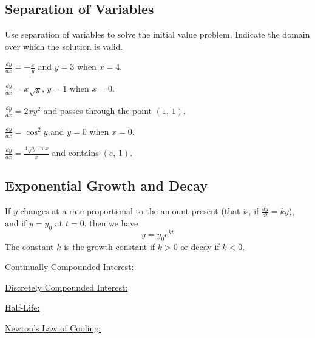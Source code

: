 \documentclass[addpoints, 12pt]{exam}
\begin{document}
\newpage
{}
\subsection*{Separation of Variables}
Use separation of variables to solve the initial value problem. Indicate the domain over which the solution is valid.
\begin{questions}
    \question $\displaystyle\frac{dy}{dx}=-\frac{x}{y}$ and $y=3$ when $x=4$.
    
    \question $\displaystyle\frac{dy}{dx}=x\sqrt{y}$, $y=1$ when $x=0$.
    
    \question$\displaystyle\frac{dy}{dx}=2xy^2$ and passes through the point $(1,\,1)$.
    
    \question$\displaystyle\frac{dy}{dx}=\cos^2 y$ and $y=0$ when $x=0$.
    
    \question$\displaystyle\frac{dy}{dx}=\frac{4\sqrt{y}\ln x}{x}$ and contains $(e,\,1)$.
\end{questions}

\newpage

\subsection*{Exponential Growth and Decay}
If $y$ changes at a rate proportional to the amount present (that is, if $\displaystyle\frac{dy}{dt}=ky$), and if $y=y_0$ at $t=0$, then we have 
\[y=y_0 e^{kt}\]
The constant $k$ is the growth constant if $k>0$ or decay if $k<0$.

\begin{minipage}{.45\linewidth}
    \underline{Continually Compounded Interest:}
\end{minipage}
\hfill
\begin{minipage}{.45\linewidth}
    \underline{Discretely Compounded Interest:}
\end{minipage}

\vspace{1in}

\begin{minipage}{.45\linewidth}
    \underline{Half-Life:}
\end{minipage}
\hfill
\begin{minipage}{.45\linewidth}
    \underline{Newton's Law of Cooling:}
\end{minipage}
\end{document}
